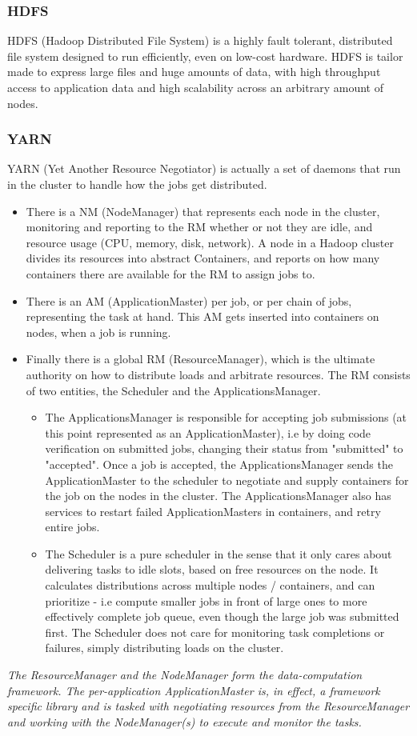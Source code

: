 \documentclass[a4paper,english]{report}
\begin{document}
				\subsubsection{HDFS}
					HDFS (Hadoop Distributed File System) is a highly fault tolerant, distributed file system designed to run efficiently, even on low-cost hardware. HDFS is tailor made to express large files and huge amounts of data, with high throughput access to application data and high scalability across an arbitrary amount of nodes.
				\subsubsection{YARN}
					YARN (Yet Another Resource Negotiator) is actually a set of daemons that run in the cluster to handle how the jobs get distributed. 
					\begin{itemize}
						\item There is a NM (NodeManager) that represents each node in the cluster, monitoring and reporting to the RM whether or not they are idle, and resource usage (CPU, memory, disk, network). A node in a Hadoop cluster divides its resources into abstract Containers, and reports on how many containers there are available for the RM to assign jobs to.
						\item There is an AM (ApplicationMaster) per job, or per chain of jobs, representing the task at hand. This AM gets inserted into containers on nodes, when a job is running.
						\item Finally there is a global RM (ResourceManager), which is the ultimate authority on how to distribute loads and arbitrate resources. The RM consists of two entities, the Scheduler and the ApplicationsManager.
							\begin{itemize}	
								\item The ApplicationsManager is responsible for accepting job submissions (at this point represented as an ApplicationMaster), i.e by doing code verification on submitted jobs, changing their status from "submitted" to "accepted". Once a job is accepted, the ApplicationsManager sends the ApplicationMaster to the scheduler to negotiate and supply containers for the job on the nodes in the cluster. The ApplicationsManager also has services to restart failed ApplicationMasters in containers, and retry entire jobs.
								\item The Scheduler is a pure scheduler in the sense that it only cares about delivering tasks to idle slots, based on free resources on the node. It calculates distributions across multiple nodes / containers, and can prioritize - i.e compute smaller jobs in front of large ones to more effectively complete job queue, even though the large job was submitted first. The Scheduler does not care for monitoring task completions or failures, simply distributing loads on the cluster.
							\end{itemize}
					\end{itemize}
					\textit{The ResourceManager and the NodeManager form the data-computation framework. The per-application ApplicationMaster is, in effect, a framework specific library and is tasked with negotiating resources from the ResourceManager and working with the NodeManager(s) to execute and monitor the tasks.}\cite{yarn}
\end{document}
